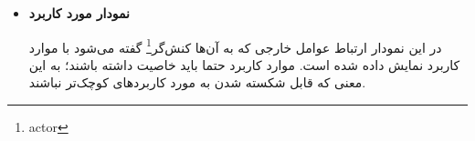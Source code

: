 \begin{itemize}
برخی نمودارهایی که در این بخش می‌توان رسم کرد عبارتند از: 

\begin{itemize}
	\item نمودار مورد کاربرد
	\item نمودار \footnote{در این نمودار رابطه‌ی بین مسئولیت‌ها و کلاس‌ها و نحوه‌ی همکاری آن‌ها نمایش داده می‌شود. منظور از}
	\item نمودار کلاس‌ها (بدون جزئیات فنی)
	\item و...
\end{itemize}
\item \textbf{نمودار مورد کاربرد}

در این نمودار ارتباط عوامل خارجی که به آن‌ها کنش‌گر\footnote{actor} گفته می‌شود با موارد کاربرد نمایش داده شده است. موارد کاربرد حتما باید خاصیت  داشته باشند؛ به این معنی که قابل شکسته شدن به مورد کاربرد‌های کوچک‌تر نباشند. 



\end{itemize}
